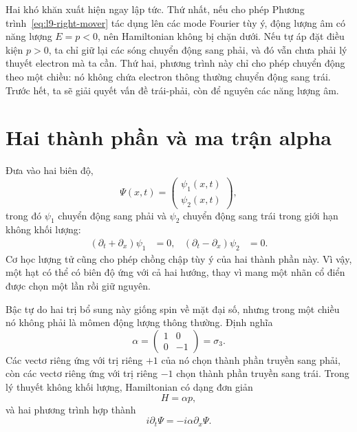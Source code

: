 Hai khó khăn xuất hiện ngay lập tức. Thứ nhất, nếu cho phép Phương trình~\eqref{eq:l9-right-mover} tác dụng lên các mode Fourier tùy ý, động lượng âm có năng lượng \(E=p<0\), nên Hamiltonian không bị chặn dưới. Nếu tự áp đặt điều kiện \(p>0\), ta chỉ giữ lại các sóng chuyển động sang phải, và đó vẫn chưa phải lý thuyết electron mà ta cần. Thứ hai, phương trình này chỉ cho phép chuyển động theo một chiều: nó không chứa electron thông thường chuyển động sang trái. Trước hết, ta sẽ giải quyết vấn đề trái-phải, còn để nguyên các năng lượng âm.

\section{Hai thành phần và ma trận alpha}

Đưa vào hai biên độ,
\begin{equation}
\Psi(x,t)=
\begin{pmatrix}
\psi_1(x,t)\\[3pt]
\psi_2(x,t)
\end{pmatrix},
\end{equation}
trong đó \(\psi_1\) chuyển động sang phải và \(\psi_2\) chuyển động sang trái trong giới hạn không khối lượng:
\begin{align}
(\partial_t+\partial_x)\psi_1&=0,
&
(\partial_t-\partial_x)\psi_2&=0.
\end{align}
Cơ học lượng tử cũng cho phép chồng chập tùy ý của hai thành phần này. Vì vậy, một hạt có thể có biên độ ứng với cả hai hướng, thay vì mang một nhãn cổ điển được chọn một lần rồi giữ nguyên.

Bậc tự do hai trị bổ sung này giống spin về mặt đại số, nhưng trong một chiều nó không phải là mômen động lượng thông thường. Định nghĩa
\begin{equation}
\alpha=
\begin{pmatrix}
1&0\\
0&-1
\end{pmatrix}
=\sigma_3.
\label{eq:l9-alpha}
\end{equation}
Các vectơ riêng ứng với trị riêng \(+1\) của nó chọn thành phần truyền sang phải, còn các vectơ riêng ứng với trị riêng \(-1\) chọn thành phần truyền sang trái. Trong lý thuyết không khối lượng, Hamiltonian có dạng đơn giản
\begin{equation}
H=\alpha p,
\end{equation}
và hai phương trình hợp thành
\begin{equation}
i\partial_t\Psi=-i\alpha\partial_x\Psi.
\label{eq:l9-massless-dirac}
\end{equation}

